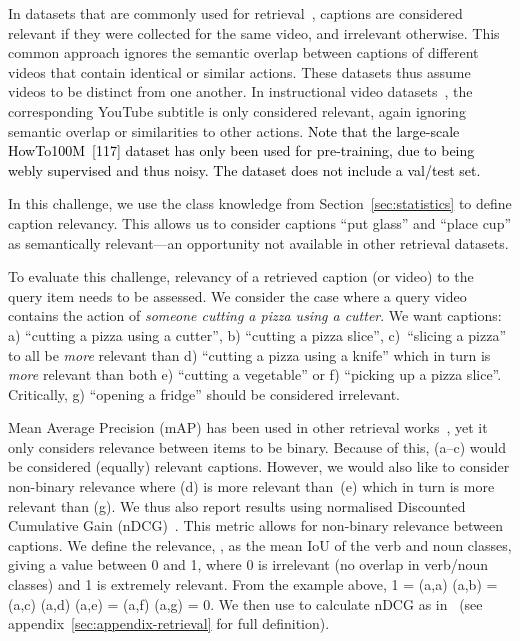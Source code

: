 \documentclass[twocolumn]{svjour3}          \smartqed
\newcommand{\chParagraph}[1]{\noindent {\textbf{#1.}} \hspace{6pt}}
\newcommand{\edits}[1]{\textcolor{black}{#1}}
\begin{document}
\chParagraph{Related Datasets}
In datasets that are commonly used for retrieval~\cite{xu2016msr,rohrbach2015dataset,zhou2017procnets,chen2011collecting}, 
captions are considered relevant if they were collected for the same video, and irrelevant otherwise. This common approach ignores the semantic overlap between captions of different videos that contain identical or similar actions. 
These datasets thus assume videos to be distinct from one another.
In instructional video datasets~\cite{zhou2017procnets,miech2019howto100m}, the corresponding YouTube subtitle is only considered relevant, again ignoring semantic overlap or similarities to other actions. \edits{Note that the large-scale HowTo100M~[117] dataset has only been used for pre-training, due to being webly supervised and thus noisy. The dataset does not include a val/test set.}

In this challenge, we use the class knowledge from Section~\ref{sec:statistics} to define caption relevancy. 
This allows us to consider captions ``put glass'' and ``place cup'' as semantically relevant---an opportunity not available in other retrieval datasets.

\chParagraph{Evaluation Metrics}
To evaluate this challenge, relevancy of a retrieved caption (or video) to the query item needs to be assessed.
We consider the case where a query video contains the action of \emph{someone cutting a pizza using a cutter}.
We want captions: a) ``cutting a pizza using a cutter'', b) ``cutting a pizza slice'', c)~``slicing a pizza'' to all be \textit{more} relevant than d) ``cutting a pizza using a knife'' which in turn is \textit{more} relevant than both e) ``cutting a vegetable'' or f) ``picking up a pizza slice''.
Critically, g) ``opening a fridge'' should be considered irrelevant.


Mean Average Precision (mAP) has been used in other retrieval works~\cite{wray2019fine,rasiwasia2014cluster,kang2015learning,cao2016correlation}, yet it only considers relevance between items to be binary.
Because of this, (a--c) would be considered (equally) relevant captions.
However, we would also like to consider non-binary relevance where (d) is more relevant than~(e) which in turn is more relevant than (g).
We thus also report results using normalised Discounted Cumulative Gain (nDCG)~\cite{jarvelin2002cumulated}. This metric allows for non-binary relevance between captions.
We define the relevance, , as the mean IoU of the verb and noun classes, giving a value between 0 and 1, where 0 is irrelevant (no overlap in verb/noun classes) and 1 is extremely relevant.
From the example above, 1 = (a,a)  (a,b) = (a,c)   (a,d)   (a,e) =  (a,f)   (a,g) = 0.
We then use  to calculate nDCG as in~\cite{jarvelin2002cumulated} (see appendix~\ref{sec:appendix-retrieval} for full definition).
\end{document}
